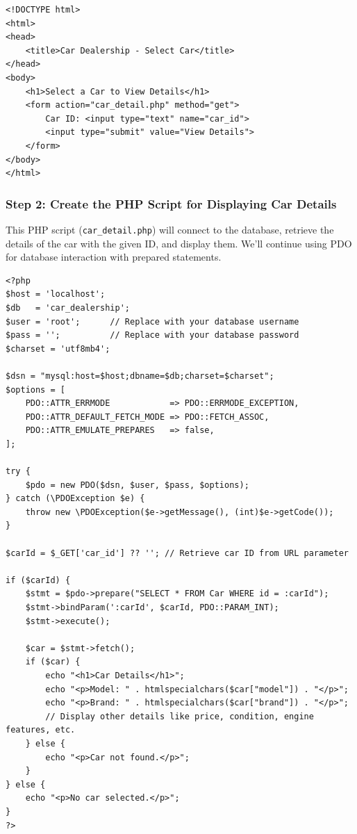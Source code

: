 \documentclass[11pt]{article}
\begin{document}
\begin{verbatim}
<!DOCTYPE html>
<html>
<head>
    <title>Car Dealership - Select Car</title>
</head>
<body>
    <h1>Select a Car to View Details</h1>
    <form action="car_detail.php" method="get">
        Car ID: <input type="text" name="car_id">
        <input type="submit" value="View Details">
    </form>
</body>
</html>
\end{verbatim}

\subsubsection{Step 2: Create the PHP Script for Displaying Car Details}
\label{sec:orgc482337}
This PHP script (\texttt{car\_detail.php}) will connect to the database,
retrieve the details of the car with the given ID, and display them.
We'll continue using PDO for database interaction with prepared
statements.

\begin{verbatim}
<?php
$host = 'localhost';
$db   = 'car_dealership';
$user = 'root';      // Replace with your database username
$pass = '';          // Replace with your database password
$charset = 'utf8mb4';

$dsn = "mysql:host=$host;dbname=$db;charset=$charset";
$options = [
    PDO::ATTR_ERRMODE            => PDO::ERRMODE_EXCEPTION,
    PDO::ATTR_DEFAULT_FETCH_MODE => PDO::FETCH_ASSOC,
    PDO::ATTR_EMULATE_PREPARES   => false,
];

try {
    $pdo = new PDO($dsn, $user, $pass, $options);
} catch (\PDOException $e) {
    throw new \PDOException($e->getMessage(), (int)$e->getCode());
}

$carId = $_GET['car_id'] ?? ''; // Retrieve car ID from URL parameter

if ($carId) {
    $stmt = $pdo->prepare("SELECT * FROM Car WHERE id = :carId");
    $stmt->bindParam(':carId', $carId, PDO::PARAM_INT);
    $stmt->execute();

    $car = $stmt->fetch();
    if ($car) {
        echo "<h1>Car Details</h1>";
        echo "<p>Model: " . htmlspecialchars($car["model"]) . "</p>";
        echo "<p>Brand: " . htmlspecialchars($car["brand"]) . "</p>";
        // Display other details like price, condition, engine features, etc.
    } else {
        echo "<p>Car not found.</p>";
    }
} else {
    echo "<p>No car selected.</p>";
}
?>
\end{verbatim}
\end{document}
